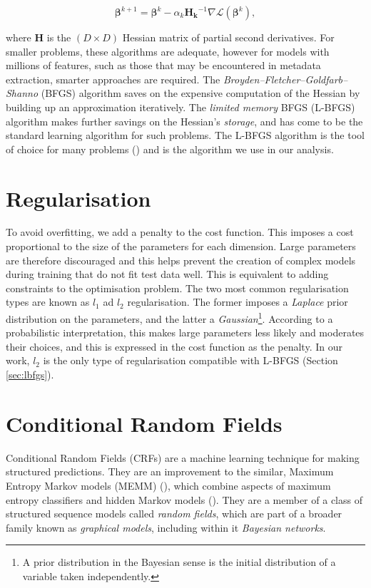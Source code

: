 \begin{equation}
\boldsymbol\beta^{k+1} = \boldsymbol\beta^{k} - \alpha_k \mathbf{H_k}^{-1}\nabla\mathcal{L}(\boldsymbol\beta^{k}),
\label{eq:newton}
\end{equation}

where $\mathbf{H}$ is the $(D \times D)$ Hessian matrix of partial second derivatives. For smaller problems, these algorithms are adequate, however for models with millions of features, such as those that may be encountered in metadata extraction, smarter approaches are required. The \emph{Broyden--Fletcher--Goldfarb--Shanno} (BFGS) algorithm saves on the expensive computation of the Hessian by building up an approximation iteratively. The \emph{limited memory} BFGS (L-BFGS) algorithm makes further savings on the Hessian's \emph{storage}, and has come to be the standard learning algorithm for such problems. The L-BFGS algorithm is the tool of choice for many problems (\cite{murphy2012machine}) and is the algorithm we use in our analysis.

\section{Regularisation}

To avoid overfitting, we add a penalty to the cost function. This imposes a cost proportional to the size of the parameters for each dimension. Large parameters are therefore discouraged and this helps prevent the creation of complex models during training that do not fit test data well. This is equivalent to adding constraints to the optimisation problem. The two most common regularisation types are known as $l_1$ ad $l_2$ regularisation. The former imposes a \emph{Laplace} prior distribution on the parameters, and the latter a \emph{Gaussian}\footnote{A prior distribution in the Bayesian sense is the initial distribution of a variable taken independently.}. According to a probabilistic interpretation, this makes large parameters less likely and moderates their choices, and this is expressed in the cost function as the penalty. In our work, $l_2$ is the only type of regularisation compatible with L-BFGS (Section \ref{sec:lbfgs}).

\section{Conditional Random Fields}
\label{subsec:crfs}

Conditional Random Fields (CRFs) are a machine learning technique for making structured predictions. They are an improvement to the similar, Maximum Entropy Markov models (MEMM) (\cite{mccallum2000maximum}), which combine aspects of maximum entropy classifiers and hidden Markov models (\cite{lafferty2001conditional}). They are a member of a class of structured sequence models called \emph{random fields}, which are part of a broader family known as \emph{graphical models}, including within it \emph{Bayesian networks}.

